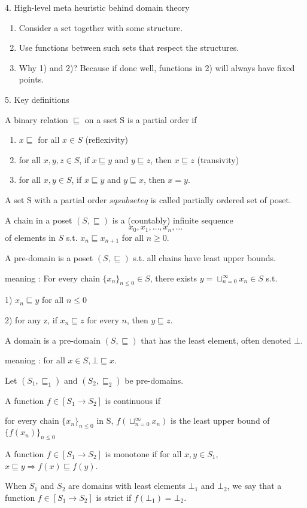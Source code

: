 \documentclass{report}[12pt]
\begin{document}
4. High-level meta heuristic behind domain theory
\begin{enumerate}
    \item Consider a set together with some structure.
    \item Use functions between such sets that respect the structures.
    \item Why 1) and 2)? Because if done well, functions in 2) will always have fixed points.
\end{enumerate}
5. Key definitions
\begin{definition}
    A binary relation $\sqsubseteq$ on a sset S is a partial order if
    \begin{enumerate}
        \item $x\sqsubseteq$ for all $x \in S$ (reflexivity)
        \item for all $x, y, z\in S$, if $x\sqsubseteq y$ and $y \sqsubseteq z$, then $x \sqsubseteq z$ (transivity)
        \item for all $x, y \in S$, if $x \sqsubseteq y$ and $y \sqsubseteq x$, then $x=y$.
    \end{enumerate}
    A set S with a partial order $sqsubseteq$ is called partially ordered set of poset.
\end{definition}
\begin{definition}
    A chain in a poset $(S, \sqsubseteq)$ is a (countably) infinite sequence
    \[x_0, x_1, \ldots, x_n, \ldots\]
    of elements in $S$ s.t. $x_n \sqsubseteq x_{n+1}$ for all $n \ge 0$.
\end{definition}
\begin{definition}
    A pre-domain is a poset $(S, \sqsubseteq)$ s.t. all chains have least upper bounds.

    meaning : For every chain $\{x_n\}_{n\le 0} \in S$, there exists $y=\sqcup_{n=0}^\infty x_n \in S$ s.t.

    1) $x_n \sqsubseteq y$ for all $n \le 0$

    2) for any z, if $x_n \sqsubseteq z$ for every $n$, then $y \sqsubseteq z$.
\end{definition}
\begin{definition}
    A domain is a pre-domain $(S, \sqsubseteq)$ that has the least element, often denoted $\bot$.

    meaning : for all $x \in S, \bot \sqsubseteq x$.
\end{definition}
\begin{definition}
    Let $(S_1, \sqsubseteq_1)$ and $(S_2, \sqsubseteq_2)$ be pre-domains.

    A function $f\in [S_1 \rightarrow S_2]$ is continuous if

    for every chain $\{x_n\}_{n\le 0}$ in S, $f(\sqcup_{n=0}^\infty x_n)$ is the least upper bound of $\{f(x_n)\}_{n\le 0}$

    A function $f \in [S_1 \rightarrow S_2]$ is monotone if for all $x, y \in S_1$, $x\sqsubseteq y \Rightarrow f(x) \sqsubseteq f(y)$.

    When $S_1$ and $S_2$ are domains with least elements $\bot_1$ and $\bot_2$, we say that a function $f\in [S_1 \rightarrow S_2]$ is strict if $f(\bot_1) = \bot_2$.
\end{definition}
\end{document}
